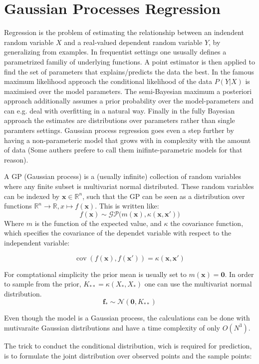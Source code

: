 \documentclass[english]{article}
\begin{document}
\section{Gaussian Processes Regression}
\label{GPR}
Regression is the problem of estimating the relationship between an indendent random variable $X$ and a real-valued dependent random variable $Y$, by generalizing from examples. In frequentist settings one ususally defines a parametrized familiy of underlying functions. A point estimator is then applied to find the set of parameters that explains/predicts the data the best. In the famous maximum likelihood approach the conditional likelihood of the data $P(Y|X)$ is maximised over the model parameters. The semi-Bayesian maximum a posteriori approach additionally assumes a prior probability over the model-parameters and can e.g. deal with overfitting in a natural way. Finally in the fully Bayesian approach the estimates are distributions over parameters rather than single paramters settings. Gaussian process regression goes even a step further by having a non-parameteric model that grows with in complexity with the amount of data (Some authers prefere to call them inifinte-parametric models for that reason).

A GP (Gaussian process) is a (usually infinite) collection of random variables where any finite subset is multivariat normal distributed. These random variables can be indexed by $\mathbf{x} \in \mathbb{R}^n$, such that the GP can be seen as a distribution over functions $\mathbb{R}^n \rightarrow \mathbb{R}, x \mapsto f(\mathbf{x})$. This is written like:
$$f(\mathbf{x}) \sim \mathcal{GP}\big(m(\mathbf{x}), \kappa(\mathbf{x},\mathbf{x}')\big)$$
Where $m$ is the function of the expected value, and $\kappa$ the covariance function, which specifies the covariance of the dependet variable with respect to the independent variable:

$$\operatorname{cov}(f(\mathbf{x}),f(\mathbf{x}')) = \kappa(\mathbf{x},\mathbf{x}')$$

For comptational simplicity the prior mean is usually set to $m(\mathbf{x}) = \mathbf{0}$. In order to sample from the prior, $K_{**} = \kappa(X_*,X_*)$ one can use the multivariat normal distribution.
$$\mathbf{f_*} \sim \mathcal{N}(\mathbf{0}, K_{**})$$

Even though the model is a Gaussian process, the calculations can be done with mutivaraite Gaussian distributions and have a time complexity of only $O(N^3)$.

The trick to conduct the conditional distribution, wich is required for prediction, is to formulate the joint distribution over observed points and the sample points:
\end{document}
